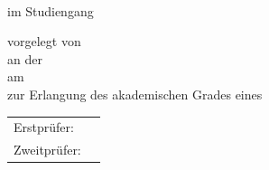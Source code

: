\begin{titlepage}
  \centering




  \vspace{20mm}
  {\huge\MakeUppercase{\getDoctype{}}}\\

  \vspace*{5mm}
  {\large im Studiengang \getCourseOfStudies{}}

  \vspace{15mm}
  {\huge\bfseries \getTitle{}}

  \vspace*{15mm}
  vorgelegt von \getAuthor{} \\
  an der \getUniversity{} \\
  am \getSubmissionDate{} \\
  zur Erlangung des akademischen Grades eines \getAcademicDegree{}

  \vspace{15mm}
  \begin{tabular}{l l}
    Erstprüfer:      & \getSupervisor{} \\
    Zweitprüfer:     & \getAdvisor{} \\
  \end{tabular}

\end{titlepage}
